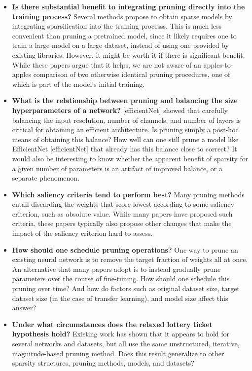 \begin{itemize}
\item \textbf{Is there substantial benefit to integrating pruning directly into the training process?} Several methods propose to obtain sparse models by integrating sparsification into the training processs. This is much less convenient than pruning a pretrained model, since it likely requires one to train a large model on a large dataset, instead of using one provided by existing libraries. However, it might be worth it if there is significant benefit. While these papers argue that it helps, we are not aware of an apples-to-apples comparison of two otherwise identical pruning procedures, one of which is part of the model's initial training.


\item \textbf{What is the relationship between pruning and balancing the size hyperparameters of a network?} [efficientNet] showed that carefully balancing the input resolution, number of channels, and number of layers is critical for obtaining an efficient architecture. Is pruning simply a post-hoc means of obtaining this balance? How well can one still prune a model like EfficientNet [efficientNet] that already has this balance close to correct? It would also be interesting to know whether the apparent benefit of sparsity for a given number of parameters is an artifact of improved balance, or a separate phenomenon.

\item \textbf{Which saliency criteria tend to perform best?} Many pruning methods entail discarding the weights that score lowest according to some saliency criterion, such as absolute value. While many papers have proposed such criteria, these papers typically also propose other changes that make the impact of the saliency criterion hard to assess.

\item \textbf{How should one schedule pruning operations?} One way to prune an existing neural network is to remove the target fraction of weights all at once. An alternative that many papers adopt is to instead gradually prune parameters over the course of fine-tuning. How should one schedule this pruning over time? And how do factors such as original dataset size, target dataset size (in the case of transfer learning), and model size affect this answer?

\item \textbf{Under what circumstances does the relaxed lottery ticket hypothesis hold?} Existing work has shown that it appears to hold for several networks and datasets, but all use the same unstructured, iterative, magnitude-based pruning method. Does this result generalize to other sparsity structures, pruning methods, models, and datasets?

\end{itemize}
